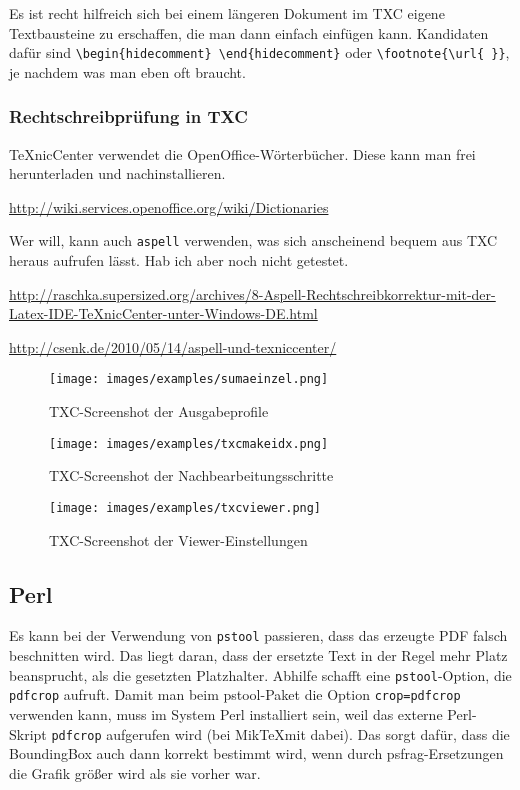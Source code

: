 Es ist recht hilfreich sich bei einem längeren Dokument im TXC eigene Textbausteine zu erschaffen, die man dann einfach einfügen kann. Kandidaten dafür sind \zb \verb+\begin{hidecomment} \end{hidecomment}+ oder \verb+\footnote{\url{ }}+, je nachdem was man eben oft braucht.

\subsubsection{Rechtschreibprüfung in TXC}

TeXnicCenter verwendet die OpenOffice-Wörterbücher. Diese kann man frei herunterladen und nachinstallieren.

{\small
\url{http://wiki.services.openoffice.org/wiki/Dictionaries}}

Wer will, kann auch \texttt{aspell} verwenden, was sich anscheinend bequem aus TXC heraus aufrufen lässt. Hab ich aber noch nicht getestet.

{\tiny
\url{http://raschka.supersized.org/archives/8-Aspell-Rechtschreibkorrektur-mit-der-Latex-IDE-TeXnicCenter-unter-Windows-DE.html}
}

{\small
\url{http://csenk.de/2010/05/14/aspell-und-texniccenter/}
}

\begin{figure}[htb]
\Centering
\texttt{[image: images/examples/sumaeinzel.png]}
\caption{TXC-Screenshot der Ausgabeprofile}
\label{fig:TXCprofile}
\end{figure}


\begin{figure}[htb]
\Centering
\texttt{[image: images/examples/txcmakeidx.png]}
\caption{TXC-Screenshot der Nachbearbeitungsschritte}
\label{fig:TXCpostproc}
\end{figure}

\begin{figure}[htb]
\Centering
\texttt{[image: images/examples/txcviewer.png]}
\caption{TXC-Screenshot der Viewer-Einstellungen}
\label{fig:TXCviewer}
\end{figure}

\subsection{Perl}

Es kann bei der Verwendung von \texttt{pstool} passieren, dass das erzeugte PDF falsch beschnitten wird. Das liegt daran, dass der ersetzte Text in der Regel mehr Platz beansprucht, als die gesetzten Platzhalter. Abhilfe schafft eine \texttt{pstool}-Option, die \texttt{pdfcrop} aufruft. Damit man beim pstool-Paket die Option \texttt{crop=pdfcrop} verwenden kann, muss im System Perl installiert sein, weil das externe Perl-Skript \texttt{pdfcrop} aufgerufen wird (bei Mik\TeX mit dabei). Das sorgt dafür, dass die BoundingBox auch dann korrekt bestimmt wird, wenn durch psfrag-Ersetzungen die Grafik größer wird als sie vorher war.

